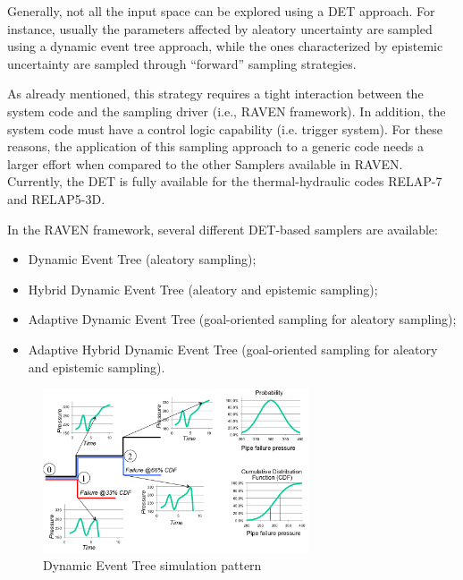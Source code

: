 Generally, not all the input space can be explored using a DET approach. For instance, usually the parameters affected by aleatory uncertainty are sampled using a dynamic event tree approach, while the ones characterized by epistemic uncertainty are sampled through ``forward'' sampling strategies. 

As already mentioned, this strategy requires a tight interaction between the system code and the sampling driver (i.e., RAVEN framework). In addition, the system code must have a control logic capability (i.e. trigger system). For these reasons, the application of this sampling approach to a generic code needs a larger effort when compared to the other Samplers available in RAVEN. Currently, the DET is fully available for the thermal-hydraulic codes RELAP-7 and RELAP5-3D.

In the RAVEN framework, several different DET-based samplers are available:
\begin{itemize}
\item Dynamic Event Tree (aleatory sampling);
\item Hybrid Dynamic Event Tree (aleatory and epistemic sampling);
\item Adaptive Dynamic Event Tree (goal-oriented sampling for aleatory sampling);
\item Adaptive Hybrid Dynamic Event Tree (goal-oriented sampling for aleatory and epistemic sampling).
\end{itemize}

\begin{figure}
  \centering
  \includegraphics[width=0.7\textwidth]  {pics/DETscheme.png}
  \caption{Dynamic Event Tree simulation pattern}
  \label{fig:DETschemeExample}
\end{figure}

